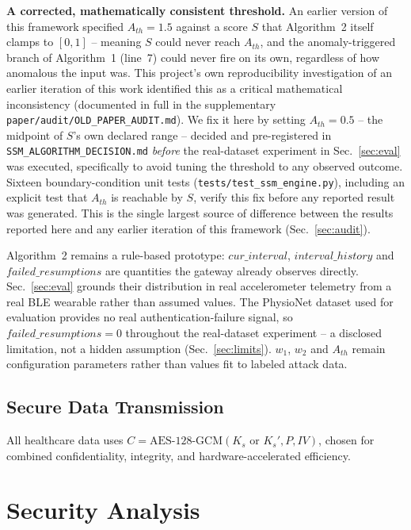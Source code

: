\documentclass[conference]{IEEEtran}
\begin{document}
\textbf{A corrected, mathematically consistent threshold.} An earlier
version of this framework specified $A_{th} = 1.5$ against a score $S$ that
Algorithm~2 itself clamps to $[0,1]$ -- meaning $S$ could never reach
$A_{th}$, and the anomaly-triggered branch of Algorithm~1 (line~7) could
never fire on its own, regardless of how anomalous the input was. This
project's own reproducibility investigation of an earlier iteration of this
work identified this as a critical mathematical inconsistency (documented in
full in the supplementary \texttt{paper/audit/OLD\_PAPER\_AUDIT.md}). We fix
it here by setting $A_{th} = 0.5$ -- the midpoint of $S$'s own declared
range -- decided and pre-registered in
\texttt{SSM\_ALGORITHM\_DECISION.md} \emph{before} the real-dataset
experiment in Sec.~\ref{sec:eval} was executed, specifically to avoid
tuning the threshold to any observed outcome. Sixteen boundary-condition
unit tests (\texttt{tests/test\_ssm\_engine.py}), including an explicit
test that $A_{th}$ is reachable by $S$, verify this fix before any
reported result was generated. This is the single largest source of
difference between the results reported here and any earlier iteration of
this framework (Sec.~\ref{sec:audit}).

Algorithm~2 remains a rule-based prototype: $\mathit{cur\_interval}$,
$\mathit{interval\_history}$ and $\mathit{failed\_resumptions}$ are
quantities the gateway already observes directly. Sec.~\ref{sec:eval}
grounds their distribution in real accelerometer telemetry from a real BLE
wearable rather than assumed values. The PhysioNet dataset used for
evaluation provides no real authentication-failure signal, so
$\mathit{failed\_resumptions} = 0$ throughout the real-dataset experiment
-- a disclosed limitation, not a hidden assumption (Sec.~\ref{sec:limits}).
$w_1$, $w_2$ and $A_{th}$ remain configuration parameters rather than
values fit to labeled attack data.

\subsection{Secure Data Transmission}

All healthcare data uses $C = \mathrm{AES\text{-}128\text{-}GCM}(K_s \text{ or } K_s', P, IV)$,
chosen for combined confidentiality, integrity, and hardware-accelerated
efficiency.

\section{Security Analysis}
\end{document}
